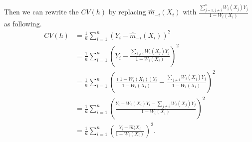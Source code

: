 \begin{solution}
    Then we can rewrite the $CV(h)$ by replacing $\hat{m}_{-i}\left(X_{i}\right)$ with $\frac{\sum_{j=1, j \neq i}^{n} W_i(X_j)Y_j}{1-W_i(X_i)}$ as following.
    \begin{equation*}
        \begin{split}
            CV(h) 
            & = \frac1n\sum_{i=1}^n (Y_i-\hat{m}_{-i}(X_i))^2  \\
            & = \frac1n\sum_{i=1}^n \left( Y_i - \frac{\sum_{j\neq i}W_i(X_j)Y_j}{1-W_i(X_i)}   \right)^2 \\
            & = \frac1n\sum_{i=1}^n \left( \frac{(1-W_i(X_i))Y_i}{1-W_i(X_i)} - \frac{\sum_{j\neq i}W_i(X_j)Y_j}{1-W_i(X_i)}   \right)^2 \\
            & = \frac1n\sum_{i=1}^n \left( \frac{Y_i - W_i(X_i)Y_i - \sum_{j\neq i}W_i(X_j)Y_j}{1-W_i(X_i)}\right)^2 \\
            & = \frac1n\sum_{i=1}^n \left( \frac{Y_i - \hat{m}(X_i}{1-W_i(X_i)}\right)^2. \\
        \end{split}
    \end{equation*}
\end{solution}
